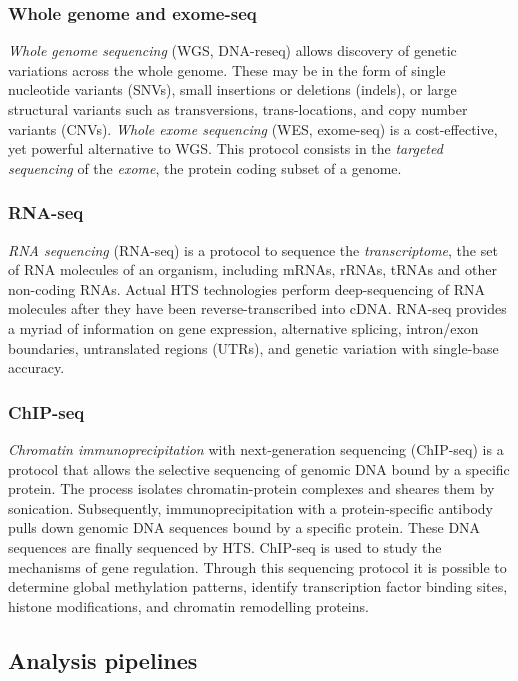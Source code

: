 \subsubsection{Whole genome and exome-seq}

\emph{Whole genome sequencing} (WGS, DNA-reseq) allows discovery of genetic variations across the whole genome.
These may be in the form of single nucleotide variants (SNVs), small insertions or deletions (indels), or large structural variants such as transversions, trans-locations, and copy number variants (CNVs).
\emph{Whole exome sequencing} (WES, exome-seq) is a cost-effective, yet powerful alternative to WGS.
This protocol consists in the \emph{targeted sequencing} of the \emph{exome}, \ie the protein coding subset of a genome.

\subsubsection{RNA-seq}
\emph{RNA sequencing} (RNA-seq) is a protocol to sequence the \emph{transcriptome}, \ie the set of RNA molecules of an organism, including mRNAs, rRNAs, tRNAs and other non-coding RNAs.
Actual HTS technologies perform deep-sequencing of RNA molecules after they have been reverse-transcribed into cDNA.
RNA-seq provides a myriad of information on gene expression, alternative splicing, intron/exon boundaries, untranslated regions (UTRs), and genetic variation with single-base accuracy.

\subsubsection{ChIP-seq}
\emph{Chromatin immunoprecipitation} with next-generation sequencing (ChIP-seq) is a protocol that allows the selective sequencing of genomic DNA bound by a specific protein.
The process isolates chromatin-protein complexes and sheares them by sonication.
Subsequently, immunoprecipitation with a protein-specific antibody pulls down genomic DNA sequences bound by a specific protein.
These DNA sequences are finally sequenced by HTS.
ChIP-seq is used to study the mechanisms of gene regulation.
Through this sequencing protocol it is possible to determine global methylation patterns, identify transcription factor binding sites, histone modifications, and chromatin remodelling proteins.

\subsection{Analysis pipelines}

